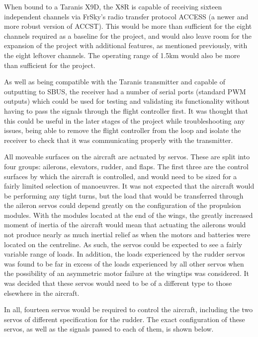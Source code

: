 \documentclass[../../main.tex]{subfiles}
\begin{document}
When bound to a Taranis X9D, the X8R is capable of receiving sixteen independent channels via FrSky’s radio transfer protocol ACCESS (a newer and more robust version of ACCST).
This would be more than sufficient for the eight channels required as a baseline for the project, and would also leave room for the expansion of the project with additional features, as mentioned previously, with the eight leftover channels.
The operating range of 1.5km would also be more than sufficient for the project. 

As well as being compatible with the Taranis transmitter and capable of outputting to SBUS, the receiver had a number of serial ports (standard PWM outputs) which could be used for testing and validating its functionality without having to pass the signals through the flight controller first.
It was thought that this could be useful in the later stages of the project while troubleshooting any issues, being able to remove the flight controller from the loop and isolate the receiver to check that it was communicating properly with the transmitter. 

All moveable surfaces on the aircraft are actuated by servos.
These are split into four groups: ailerons, elevators, rudder, and flaps.
The first three are the control surfaces by which the aircraft is controlled, and would need to be sized for a fairly limited selection of manoeuvres.
It was not expected that the aircraft would be performing any tight turns, but the load that would be transferred through the aileron servos could depend greatly on the configuration of the propulsion modules.
With the modules located at the end of the wings, the greatly increased moment of inertia of the aircraft would mean that actuating the ailerons would not produce nearly as much inertial relief as when the motors and batteries were located on the centreline.
As such, the servos could be expected to see a fairly variable range of loads.
In addition, the loads experienced by the rudder servos was found to be far in excess of the loads experienced by all other servos when the possibility of an asymmetric motor failure at the wingtips was considered.
It was decided that these servos would need to be of a different type to those elsewhere in the aircraft. 

In all, fourteen servos would be required to control the aircraft, including the two servos of different specification for the rudder.
The exact configuration of these servos, as well as the signals passed to each of them, is shown below. 
\end{document}
